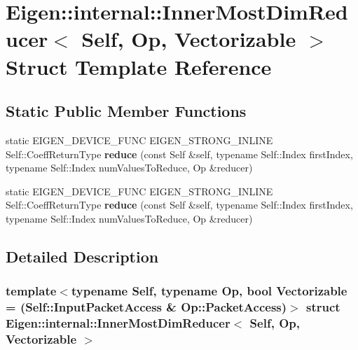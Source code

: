 \hypertarget{struct_eigen_1_1internal_1_1_inner_most_dim_reducer}{}\section{Eigen\+:\+:internal\+:\+:Inner\+Most\+Dim\+Reducer$<$ Self, Op, Vectorizable $>$ Struct Template Reference}
\label{struct_eigen_1_1internal_1_1_inner_most_dim_reducer}
\subsection*{Static Public Member Functions}
\begin{DoxyCompactItemize}
\item 
\mbox{\label{struct_eigen_1_1internal_1_1_inner_most_dim_reducer_aaee4143a17ab9c390cd30bef090003de}} 
static E\+I\+G\+E\+N\+\_\+\+D\+E\+V\+I\+C\+E\+\_\+\+F\+U\+NC E\+I\+G\+E\+N\+\_\+\+S\+T\+R\+O\+N\+G\+\_\+\+I\+N\+L\+I\+NE Self\+::\+Coeff\+Return\+Type {\bfseries reduce} (const Self \&self, typename Self\+::\+Index first\+Index, typename Self\+::\+Index num\+Values\+To\+Reduce, Op \&reducer)
\item 
\mbox{\label{struct_eigen_1_1internal_1_1_inner_most_dim_reducer_aaee4143a17ab9c390cd30bef090003de}} 
static E\+I\+G\+E\+N\+\_\+\+D\+E\+V\+I\+C\+E\+\_\+\+F\+U\+NC E\+I\+G\+E\+N\+\_\+\+S\+T\+R\+O\+N\+G\+\_\+\+I\+N\+L\+I\+NE Self\+::\+Coeff\+Return\+Type {\bfseries reduce} (const Self \&self, typename Self\+::\+Index first\+Index, typename Self\+::\+Index num\+Values\+To\+Reduce, Op \&reducer)
\end{DoxyCompactItemize}


\subsection{Detailed Description}
\subsubsection*{template$<$typename Self, typename Op, bool Vectorizable = (\+Self\+::\+Input\+Packet\+Access \& Op\+::\+Packet\+Access)$>$\newline
struct Eigen\+::internal\+::\+Inner\+Most\+Dim\+Reducer$<$ Self, Op, Vectorizable $>$}




